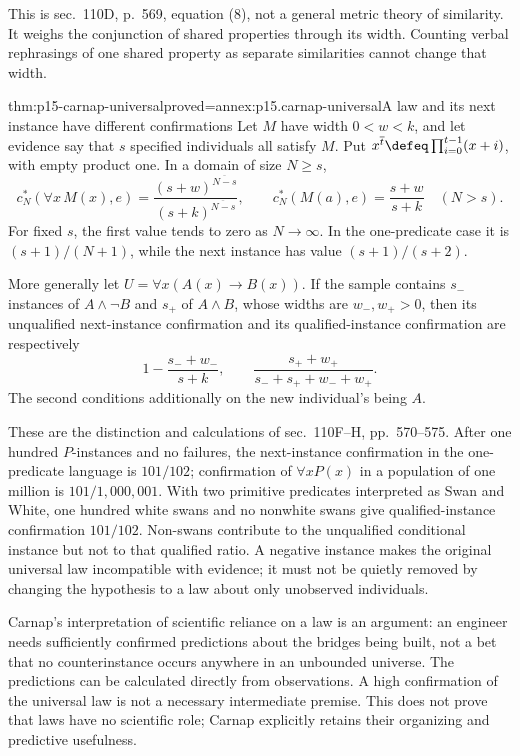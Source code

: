 This is sec.~110D, p.~569, equation (8), not a general metric theory of
similarity. It weighs the conjunction of shared properties through its
width. Counting verbal rephrasings of one shared property as separate
similarities cannot change that width.

\begin{hbtheorem}{thm:p15-carnap-universal}{proved=annex:p15.carnap-universal}{A law and its next instance have different confirmations}
Let \(M\) have width \(0<w<k\), and let evidence say that \(s\)
specified individuals all satisfy \(M\). Put
\(x^{\overline t}\defeq\prod_{i=0}^{t-1}(x+i)\), with empty
product one. In a domain of size \(N\geq s\),
\[
 c_N^*(\forall x\,M(x),e)
 =\frac{(s+w)^{\overline{N-s}}}{(s+k)^{\overline{N-s}}},\qquad
 c_N^*(M(a),e)=\frac{s+w}{s+k}\quad(N>s).
\]
For fixed \(s\), the first value tends to zero as \(N\to\infty\).
In the one-predicate case it is \((s+1)/(N+1)\), while the next
instance has value \((s+1)/(s+2)\).

More generally let \(U=\forall x(A(x)\to B(x))\). If the sample
contains \(s_-\) instances of \(A\land\neg B\) and \(s_+\)
of \(A\land B\), whose widths are \(w_-,w_+>0\), then its
unqualified next-instance confirmation and its qualified-instance
confirmation are respectively
\[
 1-\frac{s_-+w_-}{s+k},\qquad
 \frac{s_++w_+}{s_-+s_++w_-+w_+}.
\]
The second conditions additionally on the new individual's being \(A\).
\end{hbtheorem}

These are the distinction and calculations of sec.~110F--H,
pp.~570--575. After one hundred \(P\)-instances and no failures,
the next-instance confirmation in the one-predicate language is
\(101/102\); confirmation of \(\forall xP(x)\) in a population
of one million is \(101/1{,}000{,}001\). With two primitive
predicates interpreted as Swan and White, one hundred white swans and
no nonwhite swans give qualified-instance confirmation \(101/102\).
Non-swans contribute to the unqualified conditional instance but not
to that qualified ratio. A negative instance makes the original
universal law incompatible with evidence; it must not be quietly removed
by changing the hypothesis to a law about only unobserved individuals.

Carnap's interpretation of scientific reliance on a law is an argument:
an engineer needs sufficiently confirmed predictions about the bridges
being built, not a bet that no counterinstance occurs anywhere in an
unbounded universe. The predictions can be calculated directly from
observations. A high confirmation of the universal law is not a necessary
intermediate premise. This does not prove that laws have no scientific
role; Carnap explicitly retains their organizing and predictive usefulness.

